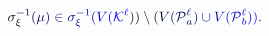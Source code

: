 \documentclass[12pt]{article}
\begin{document}
\makeatletter
\renewcommand*{\@textcolor}[3]{%
  \protect\leavevmode
  \begingroup
    \color#1{#2}#3%
  \endgroup
}
\makeatother
\begin{displaymath}
\mathcolor[RGB]{0,0,15}{\sigma} _ { \mathcolor[RGB]{0,0,30}{\xi} } ^ { \mathcolor[RGB]{0,0,45}{-} \mathcolor[RGB]{0,0,60}{1} } \mathcolor[RGB]{0,0,75}{(} \mathcolor[RGB]{0,0,90}{\mu} \mathcolor[RGB]{0,0,105}{)} \mathcolor[RGB]{0,0,120}{\in} \mathcolor[RGB]{0,0,135}{\sigma} _ { \mathcolor[RGB]{0,0,150}{\xi} } ^ { \mathcolor[RGB]{0,0,165}{-} \mathcolor[RGB]{0,0,180}{1} } \mathcolor[RGB]{0,0,195}{(} \mathcolor[RGB]{0,0,210}{V} \mathcolor[RGB]{0,0,225}{(} \mathcal { \mathcolor[RGB]{0,0,240}{K} } ^ { \mathcolor[RGB]{0,0,255}{\ell} } \mathcolor[RGB]{0,15,0}{)} \mathcolor[RGB]{0,15,15}{)} \mathcolor[RGB]{0,15,30}{\setminus} \mathcolor[RGB]{0,15,45}{(} \mathcolor[RGB]{0,15,60}{V} \mathcolor[RGB]{0,15,75}{(} \mathcal { \mathcolor[RGB]{0,15,90}{P} } _ { \mathcolor[RGB]{0,15,105}{a} } ^ { \mathcolor[RGB]{0,15,120}{\ell} } \mathcolor[RGB]{0,15,135}{)} \mathcolor[RGB]{0,15,150}{\cup} \mathcolor[RGB]{0,15,165}{V} \mathcolor[RGB]{0,15,180}{(} \mathcal { \mathcolor[RGB]{0,15,195}{P} } _ { \mathcolor[RGB]{0,15,210}{b} } ^ { \mathcolor[RGB]{0,15,225}{\ell} } \mathcolor[RGB]{0,15,240}{)} \mathcolor[RGB]{0,15,255}{)} \mathcolor[RGB]{0,30,0}{.}
\end{displaymath}
\end{document}

